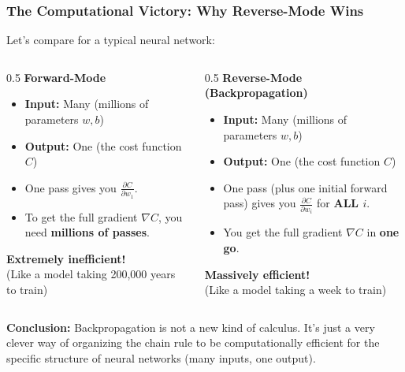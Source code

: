 \documentclass[xcolor=svgnames, 10pt, handout]{beamer}
\begin{document}
\begin{frame}
\frametitle{The Computational Victory: Why Reverse-Mode Wins}

Let's compare for a typical neural network:

\begin{columns}
\begin{column}{0.5\textwidth}
    \textbf{Forward-Mode}
    \begin{itemize}
        \item \textbf{Input:} Many (millions of parameters $w, b$)
        \item \textbf{Output:} One (the cost function $C$)
        \item One pass gives you $\frac{\partial C}{\partial w_1}$.
        \item To get the full gradient $\nabla C$, you need \textbf{millions of passes}.
    \end{itemize}
    \vspace{1cm}
    \textbf{Extremely inefficient!}\\
    (Like a model taking 200,000 years to train)
\end{column}
\begin{column}{0.5\textwidth}
    \textbf{Reverse-Mode (Backpropagation)}
    \begin{itemize}
        \item \textbf{Input:} Many (millions of parameters $w, b$)
        \item \textbf{Output:} One (the cost function $C$)
        \item One pass (plus one initial forward pass) gives you $\frac{\partial C}{\partial w_i}$ for \textbf{ALL $i$}.
        \item You get the full gradient $\nabla C$ in \textbf{one go}.
    \end{itemize}
    \vspace{1cm}
    \textbf{Massively efficient!}\\
    (Like a model taking a week to train)
\end{column}
\end{columns}

\vspace{1cm}
\textbf{Conclusion:} Backpropagation is not a new kind of calculus. It's just a very clever way of organizing the chain rule to be computationally efficient for the specific structure of neural networks (many inputs, one output).

\end{frame}
\end{document}
